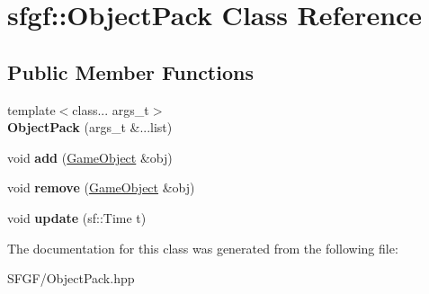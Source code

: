 \hypertarget{classsfgf_1_1ObjectPack}{}\section{sfgf\+:\+:Object\+Pack Class Reference}
\label{classsfgf_1_1ObjectPack}
\subsection*{Public Member Functions}
\begin{DoxyCompactItemize}
\item 
{\footnotesize template$<$class... args\+\_\+t$>$ }\\{\bfseries Object\+Pack} (args\+\_\+t \&...list)\hypertarget{classsfgf_1_1ObjectPack_ae3b64ca6ce9abb374c7dcab82004f33c}{}\label{classsfgf_1_1ObjectPack_ae3b64ca6ce9abb374c7dcab82004f33c}

\item 
void {\bfseries add} (\hyperlink{classsfgf_1_1GameObject}{Game\+Object} \&obj)\hypertarget{classsfgf_1_1ObjectPack_a811af32e24df6029047ca9ee13e9e048}{}\label{classsfgf_1_1ObjectPack_a811af32e24df6029047ca9ee13e9e048}

\item 
void {\bfseries remove} (\hyperlink{classsfgf_1_1GameObject}{Game\+Object} \&obj)\hypertarget{classsfgf_1_1ObjectPack_ae34a71c478e3878b6b9d2e3e75a209da}{}\label{classsfgf_1_1ObjectPack_ae34a71c478e3878b6b9d2e3e75a209da}

\item 
void {\bfseries update} (sf\+::\+Time t)\hypertarget{classsfgf_1_1ObjectPack_aba9d69c11b84d2e1cd46399b884451bc}{}\label{classsfgf_1_1ObjectPack_aba9d69c11b84d2e1cd46399b884451bc}

\end{DoxyCompactItemize}


The documentation for this class was generated from the following file\+:\begin{DoxyCompactItemize}
\item 
S\+F\+G\+F/Object\+Pack.\+hpp\end{DoxyCompactItemize}
